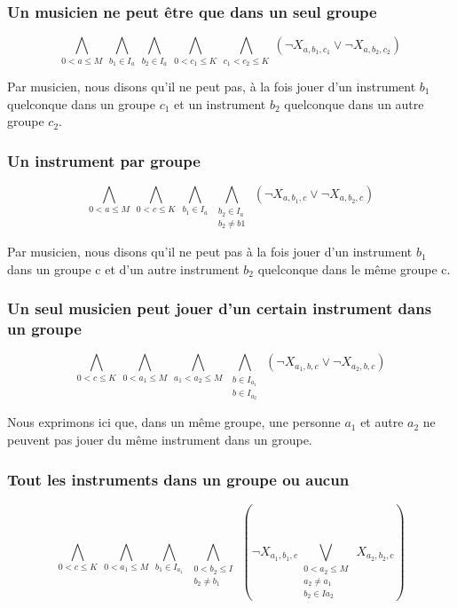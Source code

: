 \documentclass[11pt]{article}
\begin{document}
\subsubsection{Un musicien ne peut être que dans un seul groupe}

$$\bigwedge\limits_{0<a\le M}\ \bigwedge\limits_{b_1\in I_a}\ \bigwedge\limits_{b_2\in I_a}\ \bigwedge\limits_{0<c_1\le K}\ \bigwedge\limits_{c_1<c_2\le K}\ \left(\neg X_{a,b_1,c_1} \vee \neg X_{a,b_2,c_2}\right)$$

Par musicien, nous disons qu'il ne peut pas, à la fois jouer d'un instrument $b_1$ quelconque dans un groupe $c_1$ et un instrument $b_2$ quelconque dans un autre groupe $c_2$.

\subsubsection{Un instrument par groupe}

$$\bigwedge\limits_{0<a\le M}\ \bigwedge\limits_{0<c\le K}\ \bigwedge\limits_{b_1\in I_a}\ \bigwedge\limits_{\substack{b_2\in I_a \\ b_2 \ne b1}}\ \left(\neg X_{a,b_1,c} \vee \neg X_{a,b_2,c}\right)$$

Par musicien, nous disons qu'il ne peut pas à la fois jouer d'un instrument $b_1$ dans un groupe c et d'un autre instrument $b_2$ quelconque dans le même groupe c.

\subsubsection{Un seul musicien peut jouer d'un certain instrument dans un groupe}

$$\bigwedge\limits_{0<c\le K}\ \bigwedge\limits_{0<a_1\le M}\ \bigwedge\limits_{a_1<a_2\le M}\ \bigwedge\limits_{\substack{b\in I_{a_1} \\ b\in I_{a_2}}}\ \left(\neg X_{a_1,b,c} \vee \neg X_{a_2,b,c}\right)$$

Nous exprimons ici que, dans un même groupe, une personne $a_1$ et autre $a_2$ ne peuvent pas jouer du même instrument dans un groupe.

\subsubsection{Tout les instruments dans un groupe ou aucun}

$$\bigwedge\limits_{0<c\le K}\ \bigwedge\limits_{0<a_1\le M}\ \bigwedge\limits_{b_1\in I_{a_1}}\ \bigwedge\limits_{\substack{0<b_2\le I \\ b_2 \ne b_1}}\ \left(\neg X_{a_1,b_1,c} \bigvee\limits_{\substack{0<a_2\le M \\ a_2 \ne a_1 \\ b_2 \in I{a_2}}}\ X_{a_2,b_2,c}\right)$$
\end{document}

